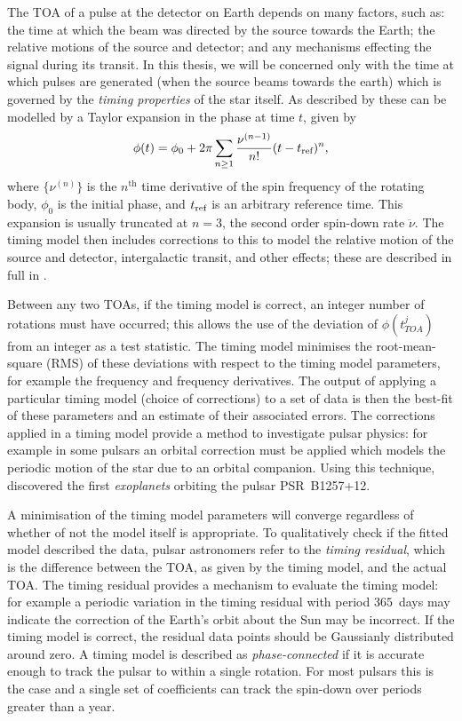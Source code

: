 The TOA of a pulse at the detector on Earth depends on many factors, such as: the
time at which the beam was directed by the source towards the Earth; the relative
motions of the source and detector; and any mechanisms effecting the signal during
its transit. In this thesis, we will be concerned only with the time at which
pulses are generated (when the source beams towards
the earth) which is governed by the \emph{timing properties} of the star itself.
As described by \citet{Edwards2006} these can be modelled by a Taylor expansion
in the phase at time $t$, given by
\begin{equation}
\phi(t) = \phi_0 + 2\pi \sum_{n\ge 1}\frac{\nu^{(n-1)}}{n!}(t - t_{\textrm{ref}})^{n},
\label{eqn: Taylor compact}
\end{equation}
where $\{\nu^{(n)}\}$ is the $n^\mathrm{th}$ time derivative of the spin
frequency of the rotating body, $\phi_0$ is the initial phase, and
$t_{\textrm{ref}}$ is an arbitrary reference time. This expansion is usually truncated at
$n=3$, the second order spin-down rate $\ddot{\nu}$. The timing model then
includes corrections to this to model the relative motion of the source and
detector, intergalactic transit, and other effects; these are described in full
in \citet{Edwards2006}.

Between any two TOAs, if the timing model is correct, an integer number of
rotations must have occurred; this allows the use of the deviation of
$\phi(t_{TOA}^{j})$ from an integer as a test statistic. The timing model
minimises the root-mean-square (RMS) of these deviations with respect to the timing model
parameters, for example the frequency and frequency derivatives. The output of
applying a particular timing model (choice of corrections) to a set of data is
then the best-fit of these parameters and an estimate of their associated
errors.  The corrections applied in a timing model provide a method to
investigate pulsar physics: for example in some pulsars an orbital correction
must be applied which models the periodic motion of the star due to an orbital
companion. Using this technique, \citet{wolszczan1992planetary} discovered the
first \emph{exoplanets} orbiting the pulsar PSR~B1257+12.

A minimisation of the timing model parameters will converge regardless of
whether of not the model itself is appropriate. To qualitatively check if the
fitted model described the data, pulsar astronomers refer to the \emph{timing
residual}, which is the difference between the TOA, as given by the timing
model, and the actual TOA. The timing residual provides a mechanism to evaluate
the timing model: for example a periodic variation in the timing residual with period
$365$~days may indicate the correction of the Earth's orbit about the Sun may
be incorrect. If the timing model is correct, the residual data points should
be Gaussianly distributed around zero. A timing model is described as
\emph{phase-connected} if it is accurate enough to track the pulsar to within a
single rotation. For most pulsars this is the case and a single set of
coefficients can track the spin-down over periods greater than a year.

